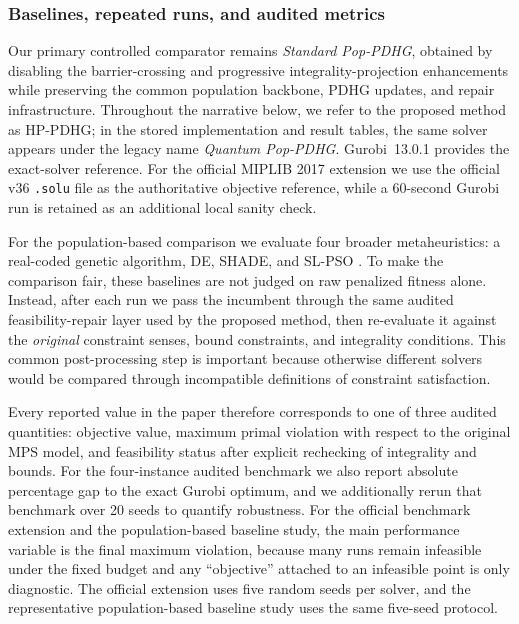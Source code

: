 \subsubsection{Baselines, repeated runs, and audited metrics}

Our primary controlled comparator remains \emph{Standard Pop-PDHG}, obtained by disabling the barrier-crossing and progressive integrality-projection enhancements while preserving the common population backbone, PDHG updates, and repair infrastructure. Throughout the narrative below, we refer to the proposed method as HP-PDHG; in the stored implementation and result tables, the same solver appears under the legacy name \emph{Quantum Pop-PDHG}. Gurobi~13.0.1 \cite{gurobi2024} provides the exact-solver reference. For the official MIPLIB 2017 extension we use the official v36 \texttt{.solu} file as the authoritative objective reference, while a 60-second Gurobi run is retained as an additional local sanity check.

For the population-based comparison we evaluate four broader metaheuristics: a real-coded genetic algorithm, DE, SHADE, and SL-PSO \cite{storn1997de,tanabe2013shade,cheng2015slpso}. To make the comparison fair, these baselines are not judged on raw penalized fitness alone. Instead, after each run we pass the incumbent through the same audited feasibility-repair layer used by the proposed method, then re-evaluate it against the \emph{original} constraint senses, bound constraints, and integrality conditions. This common post-processing step is important because otherwise different solvers would be compared through incompatible definitions of constraint satisfaction.

Every reported value in the paper therefore corresponds to one of three audited quantities: objective value, maximum primal violation with respect to the original MPS model, and feasibility status after explicit rechecking of integrality and bounds. For the four-instance audited benchmark we also report absolute percentage gap to the exact Gurobi optimum, and we additionally rerun that benchmark over 20 seeds to quantify robustness. For the official benchmark extension and the population-based baseline study, the main performance variable is the final maximum violation, because many runs remain infeasible under the fixed budget and any ``objective'' attached to an infeasible point is only diagnostic. The official extension uses five random seeds per solver, and the representative population-based baseline study uses the same five-seed protocol.

